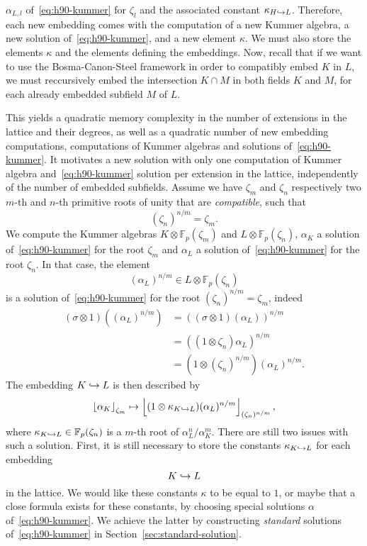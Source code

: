 $\alpha_{L, l}$ of~\eqref{eq:h90-kummer} for $\zeta_l$ and the associated
constant $\kappa_{H\hookrightarrow L}$. Therefore, each new embedding comes with the
computation of a new Kummer algebra, a new solution of~\eqref{eq:h90-kummer}, and a
new element $\kappa$. We must also store the elements $\kappa$ and the elements
defining the embeddings. Now, recall that if we want to use the Bosma-Canon-Steel
framework in order to compatibly embed $K$ in $L$, we must reccursively embed
the intersection $K\cap M$ in both fields $K$ and $M$, for each already
embedded subfield $M$ of $L$. 
\begin{center}
\end{center}
This yields a quadratic memory complexity in the number of extensions in the
lattice and their degrees, as well as a quadratic number of new embedding
computations, \ie computations of Kummer algebras and solutions
of~\eqref{eq:h90-kummer}. It motivates a new solution with only one computation
of Kummer algebra and~\eqref{eq:h90-kummer} solution per extension in the lattice,
independently of the number of embedded subfields. Assume we have $\zeta_m$ and
$\zeta_n$ respectively two $m$-th and $n$-th primitive roots
of unity that are \emph{compatible}, \ie such that
\[
  (\zeta_n)^{n/m} = \zeta_m.
\]
We compute the Kummer algebras $K\otimes\mathbb{F}_{p}(\zeta_m)$ and
$L\otimes\mathbb{F}_p(\zeta_n)$, $\alpha_K$ a solution of~\eqref{eq:h90-kummer}
for the root $\zeta_m$ and $\alpha_L$ a solution of~\eqref{eq:h90-kummer} for
the root $\zeta_n$. In that case, the element
\[
  (\alpha_L)^{n/m}\in L\otimes\mathbb{F}_p(\zeta_n)
\]
is a solution of~\eqref{eq:h90-kummer} for the root $(\zeta_n)^{n/m}=\zeta_m$,
indeed
\begin{align*}
  (\sigma\otimes1)((\alpha_L)^{n/m}) &=
  ( (\sigma\otimes1)(\alpha_{L}))^{n/m} \\
  &= ( (1\otimes\zeta_n)\alpha_L)^{n/m}\\
  &= (1\otimes (\zeta_n)^{n/m})(\alpha_L)^{n/m}.
\end{align*}
The embedding $K\hookrightarrow L$ is then described by
\[
  \left\lfloor \alpha_K \right\rfloor_{\zeta_m}\mapsto\left\lfloor (1\otimes\kappa_{K\hookrightarrow
  L})(\alpha_L)^{n/m} \right\rfloor_{(\zeta_n)^{n/m}},
\]
where $\kappa_{K\hookrightarrow L}\in\mathbb{F}_p(\zeta_n)$ is a $m$-th root of
$\alpha_L^n/\alpha_K^m$. There are still two issues with such a solution. First,
it is still necessary to store the constants $\kappa_{K\hookrightarrow L}$ for each
embedding
\[
  K\hookrightarrow L
\]
in the lattice. We would like these constants $\kappa$ to be equal to $1$, or
maybe that a close formula exists for these constants, by choosing special
solutions $\alpha$ of~\eqref{eq:h90-kummer}. We achieve the latter
by constructing \emph{standard} solutions of~\eqref{eq:h90-kummer} in
Section~\ref{sec:standard-solution}.

